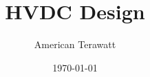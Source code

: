 \documentclass[aspectratio=169,11pt]{beamer}
\title{HVDC Design}
\author{American Terawatt}
\date{\today}
\begin{document}
\titleslide


%
%
%
%
%

% 

% 
% 

% 


% 
% 

% 
% 

% 

% 


%

\end{document}

